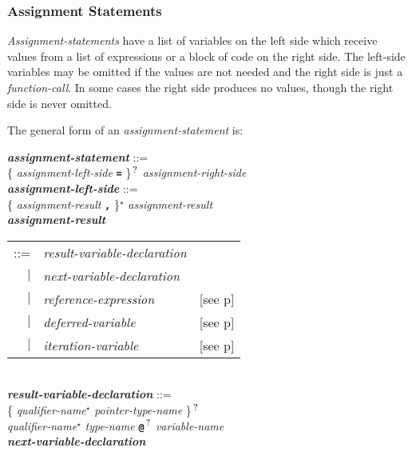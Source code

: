 \documentclass[12pt]{article}
\newcommand{\TT}[1]{{\tt \bfseries #1}}
\newcommand{\STAR}{{\Large $^\star$}}
\newcommand{\QMARK}{{$^{\,\mbox{\footnotesize ?}}$}}
\newcommand{\emkey}[1]{{\em \bfseries #1}}
\newcommand{\pagref}[1]{p\pageref{#1}}
\newenvironment{indpar}[1][0.3in]%
	{\begin{list}{}%
		     {\setlength{\itemsep}{0in}%
		      \setlength{\topsep}{0in}%
		      \setlength{\parsep}{1ex}%
		      \setlength{\labelwidth}{#1}%
		      \setlength{\leftmargin}{#1}%
		      \addtolength{\leftmargin}{\labelsep}}%
	 \item}%
	{\end{list}}
\begin{document}
\subsubsection{Assignment Statements}
\label{ASSIGNMENT-STATEMENTS}

{\em Assignment-statements} have a list of variables on the
left side which receive values from a list of expressions or
a block of code on the right side.  The left-side variables
may be omitted if the values are not needed and the right side
is just a {\em function-call}.  In some cases
the right side produces no values, though the right side is never omitted.

The general form of an {\em assignment-statement} is:
\begin{indpar}
\emkey{assignment-statement} ::= \\
\hspace*{0.5in} \{ {\em assignment-left-side} \TT{=} \}\QMARK{}
	      {\em assignment-right-side}
\\[0.5ex]
\emkey{assignment-left-side} ::= \\
\hspace*{0.5in}
    \{ {\em assignment-result} \TT{,} \}\STAR{}
    {\em assignment-result}
\\[0.5ex]
\emkey{assignment-result}
    \begin{tabular}[t]{@{}rll}
    ::= & {\em result-variable-declaration} \\
    $|$ & {\em next-variable-declaration} \\
    $|$ & {\em reference-expression}
    		& [see \pagref{REFERENCE-EXPRESSIONS}] \\
    $|$ & {\em deferred-variable}
    		& [see \pagref{DEFERRED-VARIABLE}] \\
    $|$ & {\em iteration-variable}
    		& [see \pagref{ITERATION-VARIABLE}] \\
    \end{tabular}
\\[0.5ex]
\emkey{result-variable-declaration}\label{RESULT-VARIABLE-DECLARATION} ::= \\
\hspace*{0.5in}
        \{ {\em qualifier-name}\STAR{} {\em pointer-type-name} \}\QMARK{} \\
\hspace*{1.0in}
        {\em qualifier-name}\STAR{} {\em type-name}
        \TT{@}\QMARK{} {\em variable-name}
\\[0.5ex]
\emkey{next-variable-declaration}\label{NEXT-VARIABLE-DECLARATION}

\end{indpar}
\end{document}
